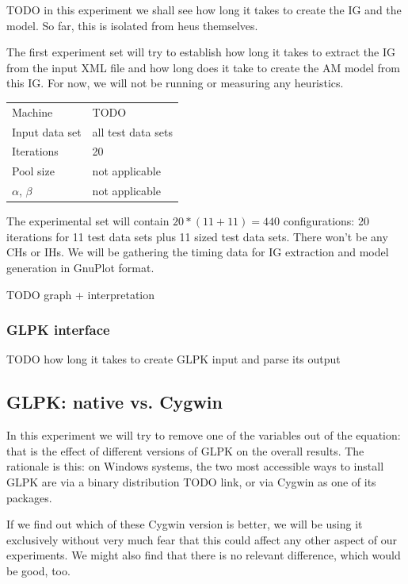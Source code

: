 \documentclass[a4paper,12pt,oneside]{report}
\theoremstyle{definition}
\begin{document}

TODO in this experiment we shall see how long it takes to create the IG and the model. So far, this is isolated from heus themselves.

The first experiment set will try to establish how long it takes to extract the IG %
from the input XML file and how long does it take to create the AM model from this IG. For now, we will not be running or measuring any heuristics.

\begin{tabular}{| l | l |}
  \hline
  \hline
  Machine           & TODO \\
  Input data set    & all test data sets \\
  Iterations        & 20 \\
  Pool size         & not applicable \\
  $\alpha$, $\beta$ & not applicable \\
  \hline
\end{tabular}  

The experimental set will contain $20 * (11 + 11) = 440$ configurations: 20 iterations for 11 test data sets plus 11 sized test data sets. There won't be any CHs or IHs. We will be gathering the timing data for IG extraction and model generation in GnuPlot format.

TODO graph + interpretation

\subsubsection{GLPK interface}

TODO how long it takes to create GLPK input and parse its output

\subsection{GLPK: native vs. Cygwin}


In this experiment we will try to remove one of the variables out of the equation: that is the effect of different versions of GLPK on the overall results. The rationale is this: on Windows systems, the two most accessible ways to install GLPK are via a binary distribution TODO link, or via Cygwin as one of its packages.

If we find out which of these Cygwin version is better, we will be using it exclusively without very much fear that this could affect any other aspect of our experiments. We might also find that there is no relevant difference, which would be good, too.
\end{document}
